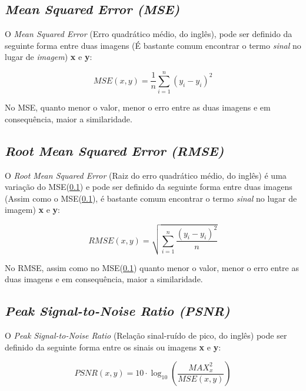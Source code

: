\subsection{\textit{Mean Squared Error (MSE)}}
\label{alg:mse}

O \textit{Mean Squared Error} (Erro quadrático médio, do inglês), pode ser definido da seguinte forma entre duas imagens (É bastante comum encontrar o termo \textit{sinal} no lugar de \textit{imagem}) \textbf{x} e \textbf{y}:

\begin{equation}
    MSE(x,y) = \frac{1}{n} \sum_{i=1}^{n} \left(y_{i}-y_{i}^{~}\right)^{2}
\end{equation}

No MSE, quanto menor o valor, menor o erro entre as duas imagens e em consequência, maior a similaridade.

\subsection{\textit{Root Mean Squared Error (RMSE)}}
\label{alg:rmse}

O \textit{Root Mean Squared Error} (Raiz do erro quadrático médio, do inglês) é uma variação do MSE(\ref{alg:mse}) e pode ser definido da seguinte forma entre duas imagens (Assim como o MSE(\ref{alg:mse}), é bastante comum encontrar o termo \textit{sinal} no lugar de imagem) \textbf{x} e \textbf{y}:

\begin{equation}
    RMSE(x,y) = \sqrt{\sum_{i=1}^{n} \frac{\left(y_{i}-y_{i}^{~}\right)^{2}}{n}}
\end{equation}

No RMSE, assim como no MSE(\ref{alg:mse}) quanto menor o valor, menor o erro entre as duas imagens e em consequência, maior a similaridade.

\subsection{\textit{Peak Signal-to-Noise Ratio (PSNR)}}
\label{alg:psnr}

O \textit{Peak Signal-to-Noise Ratio} \cite{wang_image_2004} (Relação sinal-ruído de pico, do inglês) pode ser definido da seguinte forma entre os sinais ou imagens \textbf{x} e \textbf{y}:

\begin{equation}
    PSNR(x,y) = 10\cdot \log_{10}\left(\frac{MAX_{x}^{2}}{MSE(x,y)}\right)
\end{equation}

